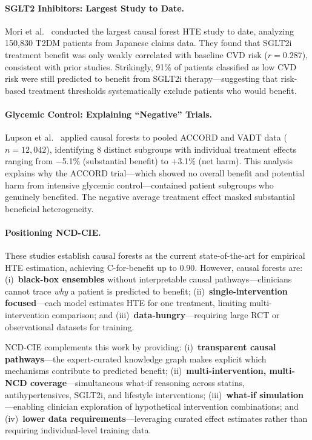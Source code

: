 \documentclass[runningheads]{llncs}
\begin{document}
\paragraph{SGLT2 Inhibitors: Largest Study to Date.}
Mori et al.~\cite{mori2026sglt2i} conducted the largest causal
forest HTE study to date, analyzing 150,830 T2DM patients from
Japanese claims data.
They found that SGLT2i treatment benefit was only weakly correlated
with baseline CVD risk ($r = 0.287$), consistent with prior studies.
Strikingly, 91\% of patients classified as low CVD risk were still
predicted to benefit from SGLT2i therapy---suggesting that
risk-based treatment thresholds systematically exclude patients
who would benefit.

\paragraph{Glycemic Control: Explaining ``Negative'' Trials.}
Lupson et al.~\cite{lupson2022glycemic} applied causal forests to
pooled ACCORD and VADT data ($n = 12{,}042$), identifying 8
distinct subgroups with individual treatment effects ranging from
$-$5.1\% (substantial benefit) to $+$3.1\% (net harm).
This analysis explains why the ACCORD trial---which showed no
overall benefit and potential harm from intensive glycemic
control---contained patient subgroups who genuinely benefited.
The negative average treatment effect masked substantial
beneficial heterogeneity.

\paragraph{Positioning NCD-CIE.}
These studies establish causal forests as the current state-of-the-art
for empirical HTE estimation, achieving C-for-benefit up to 0.90.
However, causal forests are:
(i)~\textbf{black-box ensembles} without interpretable causal
pathways---clinicians cannot trace \emph{why} a patient is predicted
to benefit;
(ii)~\textbf{single-intervention focused}---each model estimates HTE
for one treatment, limiting multi-intervention comparison; and
(iii)~\textbf{data-hungry}---requiring large RCT or observational
datasets for training.

NCD-CIE complements this work by providing:
(i)~\textbf{transparent causal pathways}---the expert-curated knowledge
graph makes explicit which mechanisms contribute to predicted benefit;
(ii)~\textbf{multi-intervention, multi-NCD coverage}---simultaneous
what-if reasoning across statins, antihypertensives, SGLT2i, and
lifestyle interventions;
(iii)~\textbf{what-if simulation}---enabling clinician exploration
of hypothetical intervention combinations; and
(iv)~\textbf{lower data requirements}---leveraging curated effect
estimates rather than requiring individual-level training data.
\end{document}
